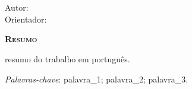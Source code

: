 \chapter*{}
\begin{center}
	{\Large{\textbf{\Titulo}}}
\end{center}

\vspace{1cm}

\begin{flushright}
	Autor: \Autor\: \Orientador
\end{flushright}

\vspace{1cm}

\begin{center}
	\Large{\textsc{\textbf{Resumo}}}
\end{center}

\noindent 
resumo do trabalho em português.


\noindent\textit{Palavras-chave}: palavra\_1; palavra\_2; palavra\_3.




